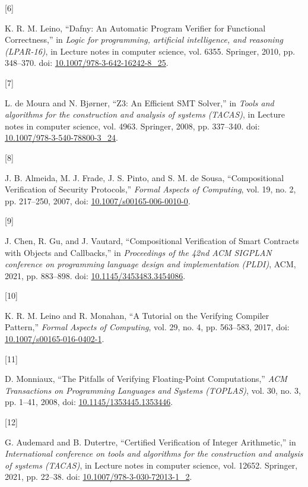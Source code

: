 \documentclass[
  english,
  onecolumn]{article}
\newlength{\cslhangindent}
\newlength{\csllabelwidth}
\newenvironment{CSLReferences}[2] %
 {\begin{list}{}{%
  \setlength{\itemindent}{0pt}
  \setlength{\leftmargin}{0pt}
  \setlength{\parsep}{0pt}
  \ifodd #1
   \setlength{\leftmargin}{\cslhangindent}
   \setlength{\itemindent}{-1\cslhangindent}
  \fi
  \setlength{\itemsep}{#2\baselineskip}}}
 {\end{list}}
\newcommand{\CSLLeftMargin}[1]{\parbox[t]{\csllabelwidth}{\strut#1\strut}}
\newcommand{\CSLRightInline}[1]{\parbox[t]{\linewidth - \csllabelwidth}{\strut#1\strut}}
\begin{document}
\begin{CSLReferences}{0}{0}
\CSLLeftMargin{{[}6{]} }%
\CSLRightInline{K. R. M. Leino, {``{Dafny: An Automatic Program Verifier
for Functional Correctness},''} in \emph{Logic for programming,
artificial intelligence, and reasoning (LPAR-16)}, in Lecture notes in
computer science, vol. 6355. Springer, 2010, pp. 348--370. doi:
\href{https://doi.org/10.1007/978-3-642-16242-8_25}{10.1007/978-3-642-16242-8\_25}.}

\CSLLeftMargin{{[}7{]} }%
\CSLRightInline{L. de Moura and N. Bjørner, {``{Z3: An Efficient SMT
Solver},''} in \emph{Tools and algorithms for the construction and
analysis of systems (TACAS)}, in Lecture notes in computer science, vol.
4963. Springer, 2008, pp. 337--340. doi:
\href{https://doi.org/10.1007/978-3-540-78800-3_24}{10.1007/978-3-540-78800-3\_24}.}

\CSLLeftMargin{{[}8{]} }%
\CSLRightInline{J. B. Almeida, M. J. Frade, J. S. Pinto, and S. M. de
Sousa, {``{Compositional Verification of Security Protocols},''}
\emph{Formal Aspects of Computing}, vol. 19, no. 2, pp. 217--250, 2007,
doi:
\href{https://doi.org/10.1007/s00165-006-0010-0}{10.1007/s00165-006-0010-0}.}

\CSLLeftMargin{{[}9{]} }%
\CSLRightInline{J. Chen, R. Gu, and J. Vautard, {``{Compositional
Verification of Smart Contracts with Objects and Callbacks},''} in
\emph{Proceedings of the 42nd ACM SIGPLAN conference on programming
language design and implementation (PLDI)}, ACM, 2021, pp. 883--898.
doi:
\href{https://doi.org/10.1145/3453483.3454086}{10.1145/3453483.3454086}.}

\CSLLeftMargin{{[}10{]} }%
\CSLRightInline{K. R. M. Leino and R. Monahan, {``{A Tutorial on the
Verifying Compiler Pattern},''} \emph{Formal Aspects of Computing}, vol.
29, no. 4, pp. 563--583, 2017, doi:
\href{https://doi.org/10.1007/s00165-016-0402-1}{10.1007/s00165-016-0402-1}.}

\CSLLeftMargin{{[}11{]} }%
\CSLRightInline{D. Monniaux, {``{The Pitfalls of Verifying
Floating-Point Computations},''} \emph{ACM Transactions on Programming
Languages and Systems (TOPLAS)}, vol. 30, no. 3, pp. 1--41, 2008, doi:
\href{https://doi.org/10.1145/1353445.1353446}{10.1145/1353445.1353446}.}

\CSLLeftMargin{{[}12{]} }%
\CSLRightInline{G. Audemard and B. Dutertre, {``{Certified Verification
of Integer Arithmetic},''} in \emph{International conference on tools
and algorithms for the construction and analysis of systems (TACAS)}, in
Lecture notes in computer science, vol. 12652. Springer, 2021, pp.
22--38. doi:
\href{https://doi.org/10.1007/978-3-030-72013-1_2}{10.1007/978-3-030-72013-1\_2}.}


\end{CSLReferences}
\end{document}
